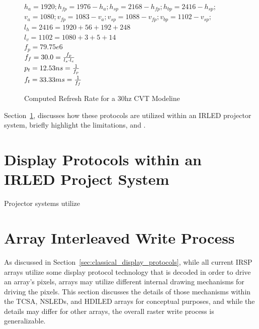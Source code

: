     \begin{figure}
        \centering
        { \Large
            $h_a=1920; h_{fp}=1976-h_a; h_{sp}=2168-h_{fp}; h_{bp}=2416-h_{sp};$ \\
            $v_a=1080; v_{fp}=1083-v_a; v_{sp}=1088-v_{fp}; v_{bp}=1102-v_{sp};$ \\
            $l_h=2416=1920+56+192+248$ \vspace{8px} \\
            $l_v=1102=1080+3+5+14$ \vspace{8px} \\
            $f_p=79.75e6$ \vspace{8px} \\
            $f_f=30.0={f_p \over {l_s \cdot l_c}}$ \\
            $p_t=12.53ns={1 \over f_p}$ \vspace{8px} \\
            $f_t=33.33ms={1 \over f_f}$ \vspace{8px}
        }
        \caption{Computed Refresh Rate for a 30hz CVT Modeline}
        \label{fig:modeline_refresh_rate_plug}
    \end{figure}

    Section~\ref{sec:displays_within_proj_system}, discusses how these protocols are utilized within an IRLED projector system, briefly highlight the limitations, and . %

\section{Display Protocols within an IRLED Project System}
    \label{sec:displays_within_proj_system}
    Projector systems utilize

\section{Array Interleaved Write Process}
    \label{sec:array_Interleaved_write_process}
    As discussed in Section~\ref{sec:classical_display_protocols}, while all current IRSP arrays utilize some display protocol technology that is decoded in order to drive an array's pixels, arrays may utilize different internal drawing mechanisms for driving the pixels. This section discusses the details of those mechanisms within the TCSA, NSLEDs, and HDILED arrays for conceptual purposes, and while the details may differ for other arrays, the overall raster write process is generalizable.


